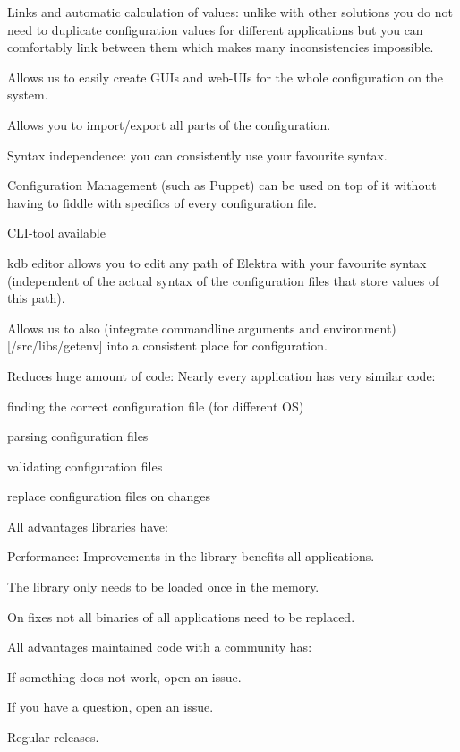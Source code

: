 \begin{DoxyItemize}
\item Links and automatic calculation of values\+: unlike with other solutions you do not need to duplicate configuration values for different applications but you can comfortably link between them which makes many inconsistencies impossible.
\item Allows us to easily create G\+U\+Is and web-\/\+U\+Is for the whole configuration on the system.
\item Allows you to import/export all parts of the configuration.
\item Syntax independence\+: you can consistently use your favourite syntax.
\item Configuration Management (such as Puppet) can be used on top of it without having to fiddle with specifics of every configuration file.
\item C\+L\+I-\/tool available
\item {\ttfamily kdb editor} allows you to edit any path of Elektra with your favourite syntax (independent of the actual syntax of the configuration files that store values of this path).
\item Allows us to also (integrate commandline arguments and environment)\mbox{[}/src/libs/getenv\mbox{]} into a consistent place for configuration.
\item Reduces huge amount of code\+: Nearly every application has very similar code\+:
\begin{DoxyItemize}
\item finding the correct configuration file (for different O\+S)
\item parsing configuration files
\item validating configuration files
\item replace configuration files on changes
\end{DoxyItemize}
\item All advantages libraries have\+:
\begin{DoxyItemize}
\item Performance\+: Improvements in the library benefits all applications.
\item The library only needs to be loaded once in the memory.
\item On fixes not all binaries of all applications need to be replaced.
\end{DoxyItemize}
\item All advantages maintained code with a community has\+:
\begin{DoxyItemize}
\item If something does not work, open an issue.
\item If you have a question, open an issue.
\item Regular releases.
\end{DoxyItemize}
\end{DoxyItemize}

